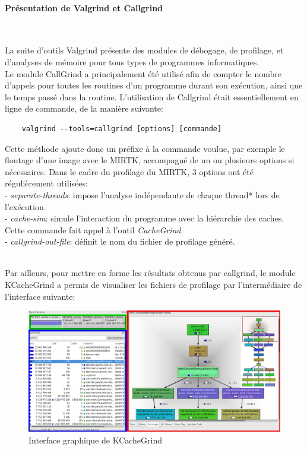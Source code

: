 \documentclass[10pt]{report}
\begin{document}
 \paragraph{Présentation de Valgrind et Callgrind}~\par
 La suite d'outils Valgrind présente des modules de débogage, de profilage, et d'analyses de mémoire pour tous types de programmes informatiques. \\
 Le module CallGrind a principalement été utilisé afin de compter le nombre d'appels pour toutes les routines d'un programme durant son exécution, ainsi que le temps passé dans la routine. L'utilisation de Callgrind était essentiellement en ligne de commande, 
 de la manière suivante:
 	\begin{lstlisting}
 	valgrind --tools=callgrind [options] [commande]
 	\end{lstlisting}
 Cette méthode ajoute donc un préfixe à la commande voulue, par exemple le floutage d'une image avec le MIRTK, accompagné de un ou plusieurs options si nécessaires. Dans le cadre du profilage du MIRTK, 3 options ont été régulièrement utilisées: \\
 - \textit{separate-threads}: impose l'analyse indépendante de chaque thread* lors de l'exécution.\\
 - \textit{cache-sim}: simule l'interaction du programme avec la hiérarchie des caches. Cette commande fait appel à l'outil \textit{CacheGrind}.\\
 - \textit{callgrind-out-file}: définit le nom du fichier de profilage généré.\\ ~\par
  \newpage
 Par ailleurs, pour mettre en forme les résultats obtenus par callgrind, le module KCacheGrind a permis de visualiser les fichiers de profilage par l'intermédiaire de l'interface suivante:\\
\begin{figure}[h!]
	\begin{center}
		\includegraphics[width=18cm]{Reports/figures/UIkcachegrind.png}	
	\end{center}
	\caption{Interface graphique de KCacheGrind}
	\label{Interface graphique de KCacheGrind}
\end{figure}\\
\end{document}
